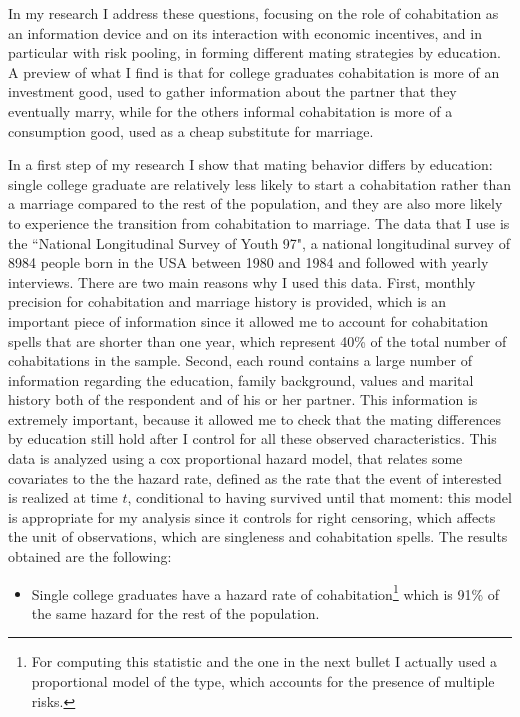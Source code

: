 \documentclass[12pt]{article}
\begin{document}
{ In my research I address these questions, focusing on the role of cohabitation as an information device and on its interaction with economic incentives, and in particular with risk pooling, in forming different mating strategies by education. A preview of what I find is that for college graduates cohabitation is more of an investment good, used to gather information about the partner that they eventually marry, while for the others informal cohabitation is more of a consumption good, used as a cheap substitute for marriage.
 
  In a first step of my research I show that mating behavior differs by education: single college graduate are relatively less likely to start a cohabitation rather than a marriage compared to the rest of the population, and they are also more likely to experience the transition from cohabitation to marriage. The data that I use is the ``National Longitudinal Survey of Youth 97", a national longitudinal survey of 8984 people born in the USA between 1980 and 1984 and followed with yearly interviews. There are two main reasons why I used this data. First, monthly precision for cohabitation and marriage history is provided, which is an important piece of information since it allowed me to account for cohabitation spells that are shorter than one year, which represent 40\% of the total number of cohabitations in the sample. Second, each round contains a large number of information regarding the education, family background, values and marital history both of the respondent and of his or her partner. This information is extremely important, because it allowed me to check that the mating differences by education still hold after I control for all these observed characteristics. This data is analyzed using a cox proportional hazard model, that relates some covariates to the the hazard rate, defined as the rate that the event of interested is realized at time $t$, conditional to having survived until that moment: this model is appropriate for my analysis since it controls for right censoring, which affects the unit of observations, which are singleness and cohabitation spells. The results obtained are the following:
\begin{itemize}
\item Single college graduates have a hazard rate of cohabitation\footnote{For computing this statistic and the one in the next bullet I actually used a proportional model of the \citet{fine1999} type, which accounts for the presence of multiple risks.} which is 91\% of the same hazard for the rest of the population.

\end{itemize}}
\end{document}
